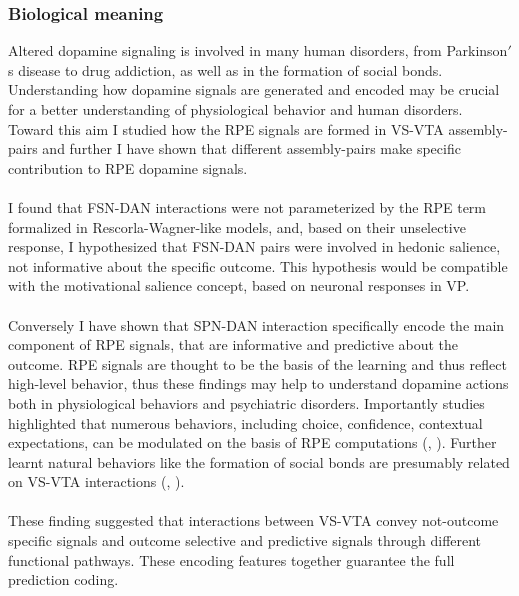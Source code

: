 \subsubsection{Biological meaning}
Altered dopamine signaling is involved in many human disorders, from Parkinson$'$s disease to drug addiction, as well as in the formation of social bonds. Understanding how dopamine signals are generated and encoded may be crucial for a better understanding of physiological behavior and human disorders.\\Toward this aim I studied how the RPE signals are formed in VS-VTA assembly-pairs and further I have shown that different assembly-pairs make specific contribution to RPE dopamine signals.\\\\I found that FSN-DAN interactions were not parameterized by the RPE term formalized in Rescorla-Wagner-like models, and, based on their unselective response, I hypothesized that FSN-DAN pairs were involved in hedonic salience, not informative about the specific outcome. This hypothesis would be compatible with the  motivational salience concept, based on neuronal responses in VP.\\\\Conversely I have shown that SPN-DAN interaction specifically encode the main component of RPE signals, that are informative and predictive about the outcome. RPE signals are thought to be the basis of the learning and thus reflect high-level behavior, thus these findings may help to understand dopamine actions both in physiological behaviors and psychiatric disorders. Importantly studies highlighted that numerous behaviors, including choice, confidence, contextual expectations, can be modulated on the basis of  RPE computations (\cite{Gadagkar}, \cite{Stauffer}). Further learnt natural behaviors like the formation of social bonds are presumably related on VS-VTA interactions (\cite{Ungless2004}, \cite{Walum}).\\\\These finding suggested that interactions between VS-VTA convey not-outcome specific signals and outcome selective and predictive signals through different functional pathways. These encoding features together guarantee the full prediction coding.


  